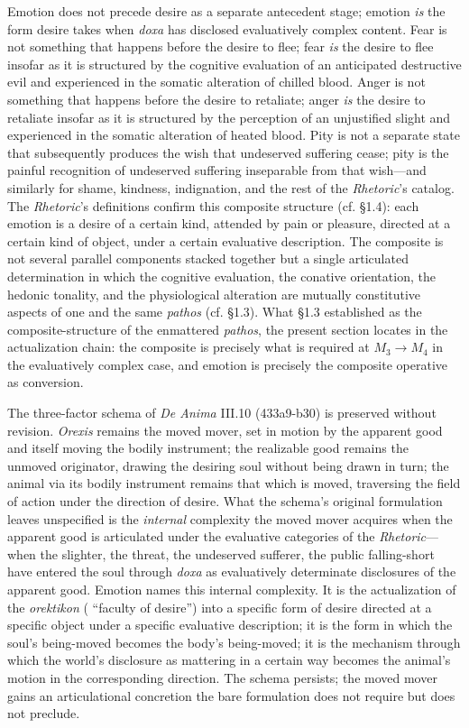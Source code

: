 Emotion does not precede desire as a separate antecedent stage; emotion \textit{is} the form desire takes when \textit{doxa} has disclosed evaluatively complex content. Fear is not something that happens before the desire to flee; fear \textit{is} the desire to flee insofar as it is structured by the cognitive evaluation of an anticipated destructive evil and experienced in the somatic alteration of chilled blood. Anger is not something that happens before the desire to retaliate; anger \textit{is} the desire to retaliate insofar as it is structured by the perception of an unjustified slight and experienced in the somatic alteration of heated blood. Pity is not a separate state that subsequently produces the wish that undeserved suffering cease; pity is the painful recognition of undeserved suffering inseparable from that wish---and similarly for shame, kindness, indignation, and the rest of the \textit{Rhetoric}'s catalog. The \textit{Rhetoric}'s definitions confirm this composite structure (cf. \S 1.4): each emotion is a desire of a certain kind, attended by pain or pleasure, directed at a certain kind of object, under a certain evaluative description. The composite is not several parallel components stacked together but a single articulated determination in which the cognitive evaluation, the conative orientation, the hedonic tonality, and the physiological alteration are mutually constitutive aspects of one and the same \textit{pathos} (cf. \S 1.3). What \S 1.3 established as the composite-structure of the enmattered \textit{pathos}, the present section locates in the actualization chain: the composite is precisely what is required at $M_3 \rightarrow M_4$ in the evaluatively complex case, and emotion is precisely the composite operative as conversion.

The three-factor schema of \textit{De Anima} III.10 (433a9-b30) is preserved without revision. \textit{Orexis} remains the moved mover, set in motion by the apparent good and itself moving the bodily instrument; the realizable good remains the unmoved originator, drawing the desiring soul without being drawn in turn; the animal via its bodily instrument remains that which is moved, traversing the field of action under the direction of desire. What the schema's original formulation leaves unspecified is the \textit{internal} complexity the moved mover acquires when the apparent good is articulated under the evaluative categories of the \textit{Rhetoric}---when the slighter, the threat, the undeserved sufferer, the public falling-short have entered the soul through \textit{doxa} as evaluatively determinate disclosures of the apparent good. Emotion names this internal complexity. It is the actualization of the \textit{orektikon} ( ``faculty of desire'') into a specific form of desire directed at a specific object under a specific evaluative description; it is the form in which the soul's being-moved becomes the body's being-moved; it is the mechanism through which the world's disclosure as mattering in a certain way becomes the animal's motion in the corresponding direction. The schema persists; the moved mover gains an articulational concretion the bare formulation does not require but does not preclude.


